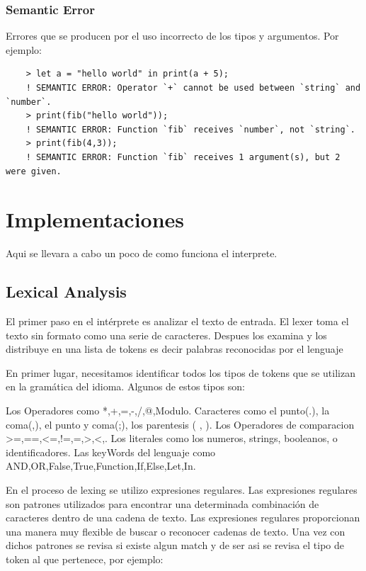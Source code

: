 \documentclass[a4paper, 12pt]{report}
\begin{document}
\subsubsection*{Semantic Error}

Errores que se producen por el uso incorrecto de los tipos y argumentos. Por ejemplo:

\begin{lstlisting}
    > let a = "hello world" in print(a + 5);
    ! SEMANTIC ERROR: Operator `+` cannot be used between `string` and `number`.
    > print(fib("hello world"));
    ! SEMANTIC ERROR: Function `fib` receives `number`, not `string`.
    > print(fib(4,3));
    ! SEMANTIC ERROR: Function `fib` receives 1 argument(s), but 2 were given.
\end{lstlisting}

\section*{Implementaciones}
Aqui se llevara a cabo un poco de como funciona el interprete.

\subsection*{Lexical Analysis}

El primer paso en el intérprete es analizar el texto de entrada. El lexer toma el texto sin formato como una serie de caracteres. Despues los examina y los distribuye en una lista de tokens es decir palabras reconocidas por el lenguaje

En primer lugar, necesitamos identificar todos los tipos de tokens que se utilizan en la gramática del idioma. Algunos de estos tipos son:

Los Operadores como *,+,=,-,/,@,Modulo. 
Caracteres como el punto(.), la coma(,), el punto y coma(;), los parentesis ( , ).
Los Operadores de comparacion >=,==,<=,!=,=,>,<,.
Los literales como los numeros, strings, booleanos, o identificadores.
Las keyWords del lenguaje como AND,OR,False,True,Function,If,Else,Let,In.


En el proceso de lexing se utilizo expresiones regulares. Las expresiones regulares son patrones utilizados para encontrar una determinada combinación de caracteres dentro de una cadena de texto. Las expresiones regulares proporcionan una manera muy flexible de buscar o reconocer cadenas de texto. Una vez con dichos patrones se revisa si existe algun match y de ser asi se revisa el tipo de token al que pertenece, por ejemplo:
\end{document}
